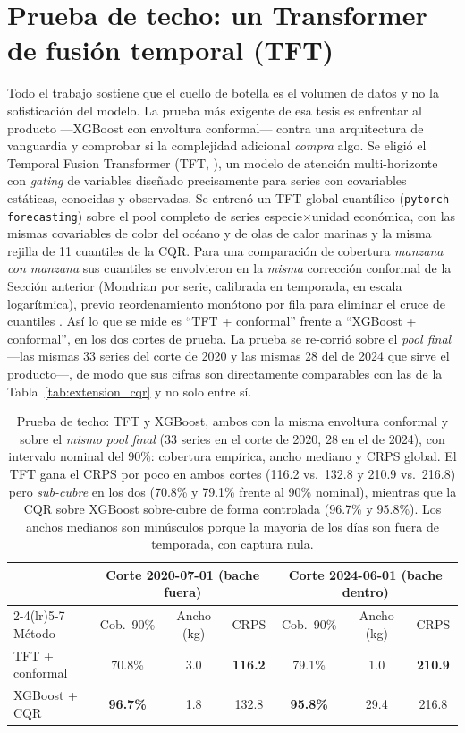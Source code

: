 \section{Prueba de techo: un Transformer de fusión temporal (TFT)}
\label{sec:res_tft}
Todo el trabajo sostiene que el cuello de botella es el volumen de datos y no la sofisticación del modelo. La prueba más exigente de esa tesis es enfrentar al producto ---XGBoost con envoltura conformal--- contra una arquitectura de vanguardia y comprobar si la complejidad adicional \emph{compra} algo. Se eligió el Temporal Fusion Transformer (TFT, \citealp{lim2021}), un modelo de atención multi-horizonte con \emph{gating} de variables diseñado precisamente para series con covariables estáticas, conocidas y observadas. Se entrenó un TFT global cuantílico (\texttt{pytorch-forecasting}) sobre el pool completo de series especie$\times$unidad económica, con las mismas covariables de color del océano y de olas de calor marinas y la misma rejilla de 11 cuantiles de la CQR. Para una comparación de cobertura \emph{manzana con manzana} sus cuantiles se envolvieron en la \emph{misma} corrección conformal de la Sección anterior (Mondrian por serie, calibrada en temporada, en escala logarítmica), previo reordenamiento monótono por fila para eliminar el cruce de cuantiles \citep{chernozhukov2010}. Así lo que se mide es ``TFT + conformal'' frente a ``XGBoost + conformal'', en los dos cortes de prueba. La prueba se re-corrió sobre el \emph{pool final} ---las mismas 33 series del corte de 2020 y las mismas 28 del de 2024 que sirve el producto---, de modo que sus cifras son directamente comparables con las de la Tabla~\ref{tab:extension_cqr} y no solo entre sí.

\begin{table}[htbp]
\centering
\small
\begin{tabular}{lcccccc}
\toprule
 & \multicolumn{3}{c}{Corte 2020-07-01 (bache fuera)} & \multicolumn{3}{c}{Corte 2024-06-01 (bache dentro)} \\
\cmidrule(lr){2-4}\cmidrule(lr){5-7}
Método & Cob.\ 90\% & Ancho (kg) & CRPS & Cob.\ 90\% & Ancho (kg) & CRPS \\
\midrule
TFT + conformal & 70.8\% & 3.0 & \textbf{116.2} & 79.1\% & 1.0 & \textbf{210.9} \\
XGBoost + CQR & \textbf{96.7\%} & 1.8 & 132.8 & \textbf{95.8\%} & 29.4 & 216.8 \\
\bottomrule
\end{tabular}
\caption{Prueba de techo: TFT y XGBoost, ambos con la misma envoltura conformal y sobre el \emph{mismo pool final} (33 series en el corte de 2020, 28 en el de 2024), con intervalo nominal del 90\%: cobertura empírica, ancho mediano y CRPS global. El TFT gana el CRPS por poco en ambos cortes (116.2 vs.\ 132.8 y 210.9 vs.\ 216.8) pero \emph{sub-cubre} en los dos (70.8\% y 79.1\% frente al 90\% nominal), mientras que la CQR sobre XGBoost sobre-cubre de forma controlada (96.7\% y 95.8\%). Los anchos medianos son minúsculos porque la mayoría de los días son fuera de temporada, con captura nula.}
\label{tab:extension_tft}
\end{table}

